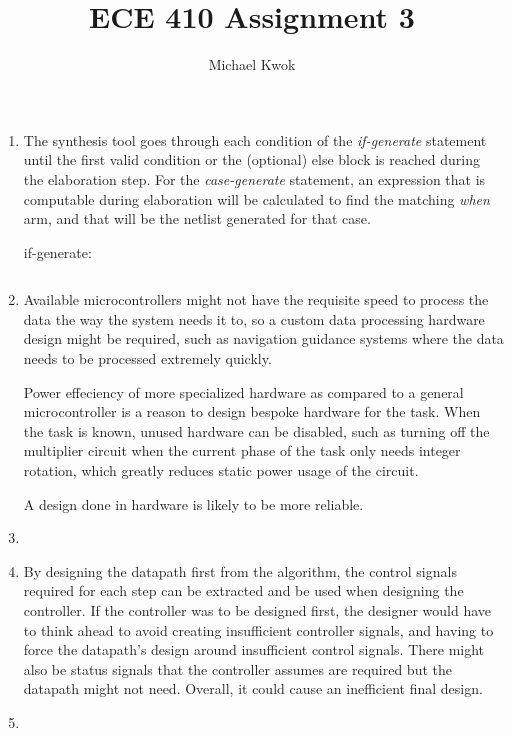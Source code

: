 \documentclass{article}
\title{ECE 410 Assignment 3}
\author{Michael Kwok}
\begin{document}
\maketitle
\begin{enumerate}
    \item The synthesis tool goes through each condition of the \textit{if-generate} statement until the first valid condition or the (optional) else block is reached during the elaboration step. For the \textit{case-generate} statement, an expression that is computable during elaboration will be calculated to find the matching \textit{when} arm, and that will be the netlist generated for that case.

          if-generate:
          \begin{verbatim}

  \end{verbatim}

    \item Available microcontrollers might not have the requisite speed to process the data the way the system needs it to, so a custom data processing hardware design might be required, such as navigation guidance systems where the data needs to be processed extremely quickly.

          Power effeciency of more specialized hardware as compared to a general microcontroller is a reason to design bespoke hardware for the task. When the task is known, unused hardware can be disabled, such as turning off the multiplier circuit when the current phase of the task only needs integer rotation, which greatly reduces static power usage of the circuit.

          A design done in hardware is likely to be more reliable. %



    \item

    \item By designing the datapath first from the algorithm, the control signals required for each step can be extracted and be used when designing the controller. If the controller was to be designed first, the designer would have to think ahead to avoid creating insufficient controller signals, and having to force the datapath's design around insufficient control signals. There might also be status signals that the controller assumes are required but the datapath might not need. Overall, it could cause an inefficient final design.

    \item


\end{enumerate}
\end{document}
